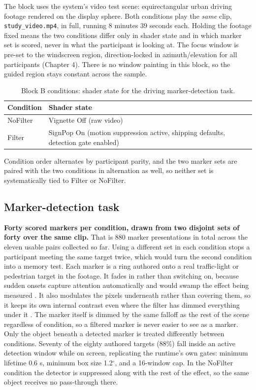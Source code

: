 The block uses the system's video test scene: equirectangular urban driving footage rendered on the
display sphere. Both conditions play the \textit{same} clip, \verb|study_video.mp4|, in full, running
8 minutes 39 seconds each. Holding the footage fixed means the two conditions differ only in shader
state and in which marker set is scored, never in what the participant is looking at. The focus
window is pre-set to the windscreen region, direction-locked in azimuth/elevation for all
participants (Chapter 4). There is no window painting in this block, so the guided region stays
constant across the sample.

\begin{longtable}{p{}|p{}}
\caption{Block B conditions: shader state for the driving marker-detection task.}\\
\hline
\textbf{Condition} & \textbf{Shader state} \\
\hline
\endhead
\hline
NoFilter & Vignette Off (raw video) \\
Filter & SignPop On (motion suppression active, shipping defaults, detection gate enabled) \\
\hline
\end{longtable}

Condition order alternates by participant parity, and the two marker sets are paired with the two
conditions in alternation as well, so neither set is systematically tied to Filter or NoFilter.

\subsection{Marker-detection task}

\textbf{Forty scored markers per condition, drawn from two disjoint sets of forty over the same
clip.} That is 880 marker presentations in total across the eleven usable pairs collected so far.
Using a different set in each condition stops a participant meeting the same target twice, which
would turn the second condition into a memory test. Each marker is a ring authored onto a real
traffic-light or pedestrian target in the footage. It fades in rather than switching on, because sudden onsets capture
attention automatically and would swamp the effect being measured \citep{yantis1984}. It also
modulates the pixels underneath rather than covering them, so it keeps its own internal contrast even
where the filter has dimmed everything under it \citep{wallis2015}. The marker itself is
dimmed by the same falloff as the rest of the scene regardless of condition, so a filtered marker is
never easier to see as a marker. Only the object beneath a detected marker is treated differently
between conditions. Seventy of the eighty authored targets (88\%) fall inside an active detection
window while on screen, replicating the runtime's own gates: minimum lifetime 0.6 s, minimum box size
1.2$^{\circ}$, and a 16-window cap. In the NoFilter condition the detector is suppressed along with the
rest of the effect, so the same object receives no pass-through there.

